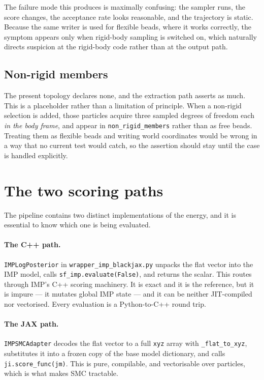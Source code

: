 \documentclass[11pt]{article}
\newcommand{\code}[1]{\texttt{#1}}
\begin{document}
The failure mode this produces is maximally confusing: the sampler runs, the
score changes, the acceptance rate looks reasonable, and the trajectory is
static. Because the same writer is used for flexible beads, where it works
correctly, the symptom appears only when rigid-body sampling is switched on,
which naturally directs suspicion at the rigid-body code rather than at the
output path.

\subsection{Non-rigid members}

The present topology declares none, and the extraction path asserts as much.
This is a placeholder rather than a limitation of principle. When a non-rigid
selection is added, those particles acquire three sampled degrees of freedom
each \emph{in the body frame}, and appear in \code{non\_rigid\_members} rather
than as free beads. Treating them as flexible beads and writing world
coordinates would be wrong in a way that no current test would catch, so the
assertion should stay until the case is handled explicitly.

\section{The two scoring paths}

The pipeline contains two distinct implementations of the energy, and it is
essential to know which one is being evaluated.

\paragraph{The C++ path.}
\code{IMPLogPosterior} in \code{wrapper\_imp\_blackjax.py} unpacks the flat
vector into the IMP model, calls \code{sf\_imp.evaluate(False)}, and returns the
scalar. This routes through IMP's C++ scoring machinery. It is exact and it is
the reference, but it is impure --- it mutates global IMP state --- and it can
be neither JIT-compiled nor vectorised. Every evaluation is a Python-to-C++
round trip.

\paragraph{The JAX path.}
\code{IMPSMCAdapter} decodes the flat vector to a full \code{xyz} array with
\code{\_flat\_to\_xyz}, substitutes it into a frozen copy of the base model
dictionary, and calls \code{ji.score\_func(jm)}. This is pure, compilable, and
vectorisable over particles, which is what makes SMC tractable.
\end{document}
